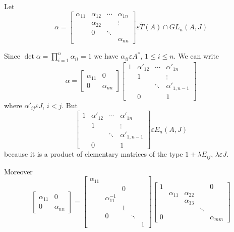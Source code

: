 \begin{Proof}
Let 
$$
\alpha=
\begin{bmatrix}
\alpha_{11}&\alpha_{12}&\cdots & \alpha_{1n}\\
& \alpha_{22}& &\vdots\\
& 0 & \ddots &\\
& & & \alpha_{nn}
\end{bmatrix} \varepsilon \tilde{T}(A)\cap GL_n(A,J)
$$

Since $\det \alpha=\prod\limits_{i=1}^{n}\alpha_{ii}=1$ we have
$\alpha_{ii}\varepsilon A^{\ast}$, $1\leq i\leq n$. We can write
$$
\alpha=
\begin{bmatrix}
\alpha_{11}& 0\\
0 & \alpha_{nn}
\end{bmatrix} \begin{bmatrix}
1 & \alpha'_{12}&\cdots & \alpha'_{1n}\\
& 1 & &\vdots\\
& &  \ddots &\alpha'_{1,n-1}\\
& 0 && 1
\end{bmatrix}
$$
where $\alpha'_{ij}\varepsilon J$, $i<j$. But
$$
\begin{bmatrix}
1 & \alpha'_{12}& \cdots & \alpha'_{1n}\\
& 1 & & \vdots\\
& & \ddots & \alpha'_{1,n-1}\\
& 0 & & 1
\end{bmatrix} \varepsilon E_n(A,J)
$$
because it is a product of elementary matrices of the type $1+\lambda
E_{ij}$, $\lambda \varepsilon J$. 
 
Moreover
$$
\begin{bmatrix}
\alpha_{11} & 0\\
0 & \alpha_{nn}
\end{bmatrix}= \begin{bmatrix}
\alpha_{11} & & & &\\
& & 0 &&\\
& \alpha^{-1}_{11} & & &\\
& & 1 & &\\
& 0 & &\ddots & \\
&& & &1
\end{bmatrix} \begin{bmatrix}
1 & & & &0\\
& \alpha_{11}&\alpha_{22} & & \\
& & \alpha_{33} & & \\
& & &\ddots & \\
0 & & & &\alpha_{mm}
\end{bmatrix}
$$


\end{Proof}

